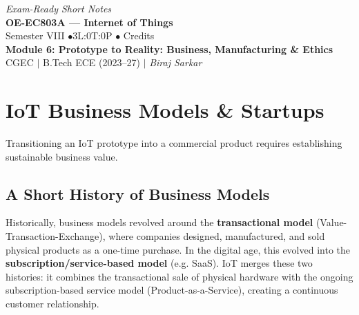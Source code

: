 \documentclass[12pt,a4paper]{article}
\begin{document}
\begin{center}
  \hfill \textit{Exam-Ready Short Notes} \\
  \vspace{6pt}
  {\LARGE\bfseries\color{myred} OE-EC803A --- Internet of Things}\\[5pt]
  {\normalsize\color{mydark} Semester VIII \quad$\bullet$\quad 3L:0T:0P \quad$\bullet$ Credits}\\[3pt]
  {\normalsize\color{myteal}\textbf{Module 6: Prototype to Reality: Business, Manufacturing \& Ethics}}\\[3pt]
  {\small\color{mydark} CGEC \;$|$\; B.Tech ECE (2023--27) \;$|$\; \textit{Biraj Sarkar}}
\end{center}
\vspace{2pt}
\noindent{\color{myred}\rule{\linewidth}{1.5pt}}
\vspace{2pt}

\hypersetup{linkcolor=mydark}
\tableofcontents
\hypersetup{linkcolor=myteal}
\newpage

\section{IoT Business Models \& Startups}

Transitioning an IoT prototype into a commercial product requires establishing sustainable business value.

\subsection{A Short History of Business Models}
Historically, business models revolved around the \textbf{transactional model} (Value-Transaction-Exchange), where companies designed, manufactured, and sold physical products as a one-time purchase. 
In the digital age, this evolved into the \textbf{subscription/service-based model} (e.g. SaaS). IoT merges these two histories: it combines the transactional sale of physical hardware with the ongoing subscription-based service model (Product-as-a-Service), creating a continuous customer relationship.
\end{document}

